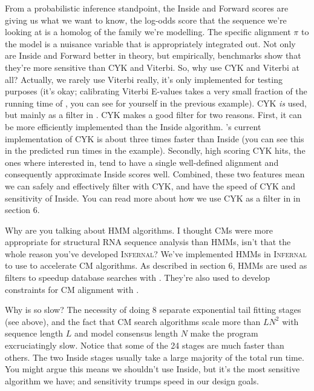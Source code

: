 From a probabilistic inference standpoint, the Inside and Forward
scores are giving us what we want to know, the log-odds score that the
sequence we're looking at is a homolog of the family we're
modelling. The specific alignment $\pi$ to the model is a nuisance
variable that is appropriately integrated out. Not only are Inside and
Forward better in theory, but empirically, benchmarks show that
they're more sensitive than CYK and Viterbi. So, why use CYK and
Viterbi at all?  Actually, we rarely use Viterbi really, it's
only implemented for testing purposes (it's okay; calibrating Viterbi
E-values takes a very small fraction of the running time of
, you can see for yourself in the previous
example). CYK \emph{is} used, but mainly as a filter in
. CYK makes a good filter for two reasons. First, it can be
more efficiently implemented than the Inside
algorithm. 's current implementation of CYK is
about three times faster than Inside (you can see this in the
predicted run times in the  example). Secondly,
high scoring CYK hits, the ones where interested in, tend to have a
single well-defined alignment and consequently approximate Inside
scores well. Combined, these two features mean we can safely and
effectively filter with CYK, and have the speed of CYK and sensitivity
of Inside. You can read more about how we use CYK as a filter in
 in section 6.


\begin{srefaq}{Why are you talking about HMM algorithms. I thought CMs
    were more appropriate for structural RNA sequence analysis than
    HMMs, isn't that the whole reason you've developed \textsc{Infernal}?} 
  We've implemented HMMs in \textsc{Infernal} to use to accelerate CM
    algorithms. As described in section 6, HMMs are used as filters to
    speedup database searches with . They're also used to develop
    constraints for CM alignment with .  
\end{srefaq}


\begin{srefaq}{Why is  so slow?} The
    necessity of doing 8 separate exponential tail fitting stages
    (see above), and the fact that CM search algorithms scale more
    than $LN^2$ with sequence length $L$ and model consensus length
    $N$ make the program excruciatingly slow. Notice that some of the
    24 stages are much faster than others. The two Inside stages usually
    take a large majority of the total run time. You might argue this
    means we shouldn't use Inside, but it's the most sensitive
    algorithm we have; and sensitivity trumps speed in our design
    goals.
\end{srefaq}

